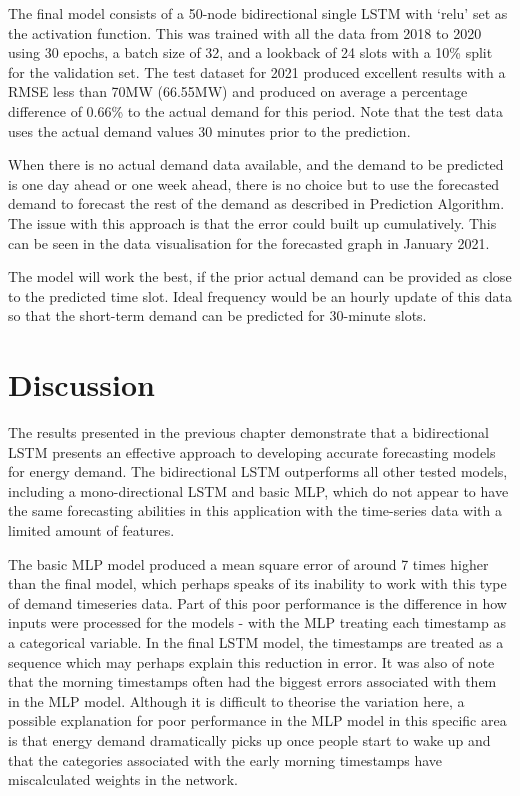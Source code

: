 \documentclass[mstat,12pt]{unswthesis}
\begin{document}
The final model consists of a 50-node bidirectional single LSTM with
`relu' set as the activation function. This was trained with all the
data from 2018 to 2020 using 30 epochs, a batch size of 32, and a
lookback of 24 slots with a 10\% split for the validation set. The test
dataset for 2021 produced excellent results with a RMSE less than 70MW
(66.55MW) and produced on average a percentage difference of 0.66\% to
the actual demand for this period. Note that the test data uses the
actual demand values 30 minutes prior to the prediction.

\bigskip

When there is no actual demand data available, and the demand to be
predicted is one day ahead or one week ahead, there is no choice but to
use the forecasted demand to forecast the rest of the demand as
described in Prediction Algorithm. The issue with this approach is that
the error could built up cumulatively. This can be seen in the data
visualisation for the forecasted graph in January 2021.

\bigskip

The model will work the best, if the prior actual demand can be provided
as close to the predicted time slot. Ideal frequency would be an hourly
update of this data so that the short-term demand can be predicted for
30-minute slots.

\hypertarget{discussion}{%
\chapter{Discussion}\label{discussion}}

The results presented in the previous chapter demonstrate that a
bidirectional LSTM presents an effective approach to developing accurate
forecasting models for energy demand. The bidirectional LSTM outperforms
all other tested models, including a mono-directional LSTM and basic
MLP, which do not appear to have the same forecasting abilities in this
application with the time-series data with a limited amount of features.

\bigskip

The basic MLP model produced a mean square error of around 7 times
higher than the final model, which perhaps speaks of its inability to
work with this type of demand timeseries data. Part of this poor
performance is the difference in how inputs were processed for the
models - with the MLP treating each timestamp as a categorical variable.
In the final LSTM model, the timestamps are treated as a sequence which
may perhaps explain this reduction in error. It was also of note that
the morning timestamps often had the biggest errors associated with them
in the MLP model. Although it is difficult to theorise the variation
here, a possible explanation for poor performance in the MLP model in
this specific area is that energy demand dramatically picks up once
people start to wake up and that the categories associated with the
early morning timestamps have miscalculated weights in the network.
\end{document}
